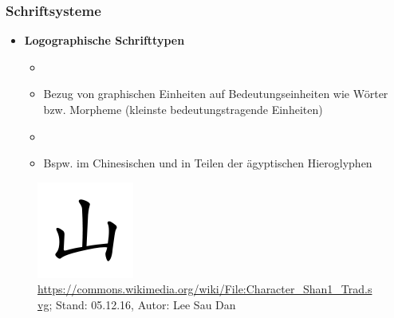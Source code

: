 \begin{frame}
\begin{minipage}{.58\textwidth}
%

\end{minipage}

\end{frame}



\begin{frame}
\frametitle{Schriftsysteme}

\begin{itemize}
	\item \textbf{Logographische Schrifttypen}
	
	\begin{itemize}
		\item[]
		\item Bezug von graphischen Einheiten auf Bedeutungseinheiten wie Wörter bzw. Morpheme (kleinste bedeutungstragende Einheiten) 
		\item[]
		\item Bspw. im Chinesischen und in Teilen der ägyptischen Hieroglyphen
		
		
		\end{itemize}
\end{itemize}
		
	\begin{minipage}{.48\textwidth}
	
	\begin{figure}
	\centering
	\includegraphics[scale=.45]{material/Chinesemountain-Lee-Sau-Dan}
	\caption[chinese]{\url{https://commons.wikimedia.org/wiki/File:Character\_Shan1\_Trad.svg}; Stand: 05.12.16, Autor: Lee Sau Dan}
	\end{figure}
	
	\end{minipage}\hfill%
	\begin{minipage}{.48\textwidth}
	

\end{minipage}
\end{frame}
